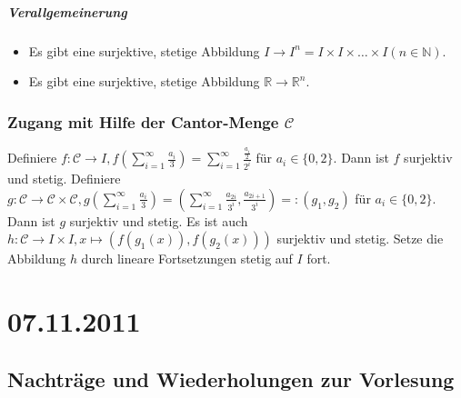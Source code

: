 \documentclass[a4paper,11pt,notitlepage]{report}
\newcommand{\R}{{\ensuremath{\mathbb{R}}}}
\newcommand{\N}{{\ensuremath{\mathbb{N}}}}
\begin{document}
\paragraph{Verallgemeinerung}
\begin{itemize}
\item Es gibt eine surjektive, stetige Abbildung $I \rightarrow I^n = I \times I \times \ldots \times I (n \in \N)$.
\item Es gibt eine surjektive, stetige Abbildung $\R \rightarrow \R^n$.
\end{itemize}

\subsection{Zugang mit Hilfe der Cantor-Menge $\mathcal{C}$}
Definiere $f \colon \mathcal{C} \rightarrow I, f \left(\sum\limits_{i=1}^{\infty}{\frac{a_i}{3}} \right) = \sum\limits_{i=1}^{\infty}{\frac{\frac{a_i}{2}}{2^i}}$ für $a_i \in \{0,2\}$.
\newline
Dann ist $f$ surjektiv und stetig.
\newline
Definiere $g \colon \mathcal{C} \rightarrow \mathcal{C} \times \mathcal{C}, g \left(\sum\limits_{i=1}^{\infty}{\frac{a_i}{3}} \right) = \left(\sum\limits_{i=1}^{\infty}{\frac{a_{2i}}{3^i}}, \frac{a_{2i+1}}{3^i} \right)=:(g_1,g_2)$ für $a_i \in \{0,2\}$.
\newline
Dann ist $g$ surjektiv und stetig.
\newline
Es ist auch $h \colon \mathcal{C} \rightarrow I \times I, x \mapsto \left(f(g_1(x)), f(g_2(x))\right)$ surjektiv und stetig.
\newline
Setze die Abbildung $h$ durch lineare Fortsetzungen stetig auf $I$ fort.

\chapter{07.11.2011}
\section{Nachträge und Wiederholungen zur Vorlesung}
\end{document}

